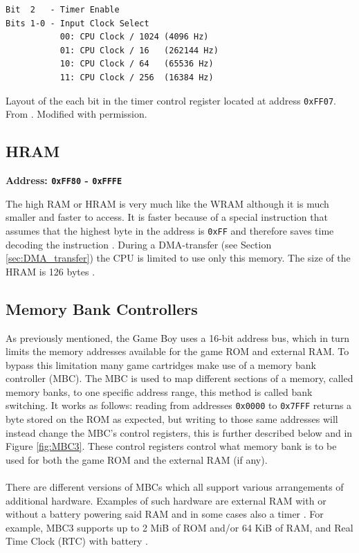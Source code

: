 \begin{table}[H]
    \begin{center}

\begin{BVerbatim}
Bit  2   - Timer Enable
Bits 1-0 - Input Clock Select
           00: CPU Clock / 1024 (4096 Hz)
           01: CPU Clock / 16   (262144 Hz)
           10: CPU Clock / 64   (65536 Hz)
           11: CPU Clock / 256  (16384 Hz)
\end{BVerbatim}

    \caption{Layout of the each bit in the timer control register located at address \texttt{0xFF07}. From \cite{pandocstimer}. Modified with permission.}
    \label{tab:timer_tac}
    \end{center}
\end{table}

\subsection{HRAM}
\textbf{Address: \texttt{0xFF80} - \texttt{0xFFFE}}

The high RAM or HRAM is very much like the WRAM although it is much smaller and faster to access. 
It is faster because of a special instruction that assumes that the highest byte in the address is \texttt{0xFF} and therefore saves time decoding the instruction \cite{OpCodes}. 
During a DMA-transfer (see Section \ref{sec:DMA_transfer}) the CPU is limited to use only this memory.
The size of the HRAM is 126 bytes \cite{pandocsmemorymap}. 
\newpage
\subsection{Memory Bank Controllers}
\label{sec:MBC}
As previously mentioned, the Game Boy uses a 16-bit address bus, which in turn limits the memory addresses available for the game ROM and external RAM. 
To bypass this limitation many game cartridges make use of a memory bank controller (MBC).
The MBC is used to map different sections of a memory, called memory banks, to one specific address range, this method is called bank switching.
It works as follows: reading from addresses \texttt{0x0000} to \texttt{0x7FFF} returns a byte stored on the ROM as expected, but writing to those same addresses will instead change the MBC's control registers, this is further described below and in Figure \ref{fig:MBC3}. 
These control registers control what memory bank is to be used for both the game ROM and the external RAM (if any).
\\\\
There are different versions of MBCs which all support various arrangements of additional hardware. 
Examples of such hardware are external RAM with or without a battery powering said RAM and in some cases also a timer \cite{GBWikiMBC}. For example, MBC3 supports up to 2 MiB of ROM and/or 64 KiB of RAM, and Real Time Clock (RTC) with battery \cite{GBWikiMBC}.

